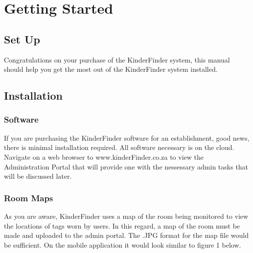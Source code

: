 \documentclass{article}
\begin{document}
\newpage

\section{Getting Started}
\subsection{Set Up}
Congratulations on your purchase of the KinderFinder system, this manual should help you get the most out of the KinderFinder system installed.

\subsection{Installation}
\subsubsection{Software}
If you are purchasing the KinderFinder software for an establishment, good news, there is minimal installation required.
All software necessary is on the cloud. Navigate on a web browser to www.kinderFinder.co.za to view the Administration Portal that will provide one with the nessessary admin tasks that will be discussed later.

\subsubsection{Room Maps}
As you are aware, KinderFinder uses a map of the room being monitored to view the locations of tags worn by users. In this regard, a map of the room must be made and uploaded to the admin portal. The .JPG format for the map file would be sufficient. On the mobile application it would look similar to figure 1 below.
\end{document}
